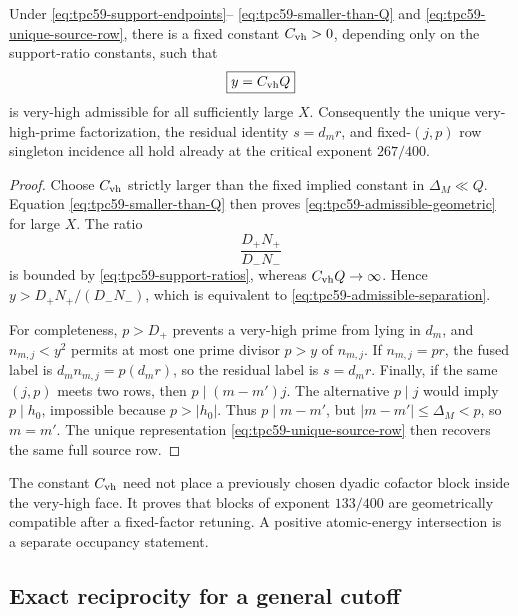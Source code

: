 \begin{theorem}
\label{thm:tpc59-critical-cutoff}
Under \eqref{eq:tpc59-support-endpoints}--
\eqref{eq:tpc59-smaller-than-Q} and
\eqref{eq:tpc59-unique-source-row}, there is a fixed constant
\(C_{\rm vh}>0\), depending only on the support-ratio constants, such that
\begin{equation}
 \boxed{y=C_{\rm vh}Q}
 \label{eq:tpc59-critical-y}
\end{equation}
is very-high admissible for all sufficiently large \(X\).
Consequently the unique very-high-prime factorization, the residual identity
\(s=d_mr\), and fixed-\((j,p)\) row singleton incidence all hold already at
the critical exponent \(267/400\).
\end{theorem}

\begin{proof}
Choose \(C_{\rm vh}\) strictly larger than the fixed implied constant in
\(\Delta_M\ll Q\).  Equation \eqref{eq:tpc59-smaller-than-Q} then proves
\eqref{eq:tpc59-admissible-geometric} for large \(X\).  The ratio
\[
 \frac{D_+N_+}{D_-N_-}
\]
is bounded by \eqref{eq:tpc59-support-ratios}, whereas
\(C_{\rm vh}Q\to\infty\).  Hence
\(y>D_+N_+/(D_-N_-)\), which is equivalent to
\eqref{eq:tpc59-admissible-separation}.

For completeness, \(p>D_+\) prevents a very-high prime from lying in
\(d_m\), and \(n_{m,j}<y^2\) permits at most one prime divisor \(p>y\) of
\(n_{m,j}\).  If \(n_{m,j}=pr\), the fused label is
\(d_mn_{m,j}=p(d_mr)\), so the residual label is \(s=d_mr\).  Finally, if
the same \((j,p)\) meets two rows, then
\(p\mid(m-m')j\).  The alternative \(p\mid j\) would imply
\(p\mid h_0\), impossible because \(p>|h_0|\).  Thus
\(p\mid m-m'\), but \(|m-m'|\le\Delta_M<p\), so \(m=m'\).
The unique representation \eqref{eq:tpc59-unique-source-row} then recovers
the same full source row.
\end{proof}

\begin{remark}
The constant \(C_{\rm vh}\) need not place a previously chosen dyadic
cofactor block inside the very-high face.  It proves that blocks of exponent
\(133/400\) are geometrically compatible after a fixed-factor retuning.  A
positive atomic-energy intersection is a separate occupancy statement.
\end{remark}

\subsection{Exact reciprocity for a general cutoff}

